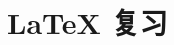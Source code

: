 \documentclass{beamer}
\subtitle{第三节：还有幻灯，还有……}
\begin{document}
\begin{frame}
\titlepage
\end{frame}


\section{\LaTeX{} 复习}
\end{document}
